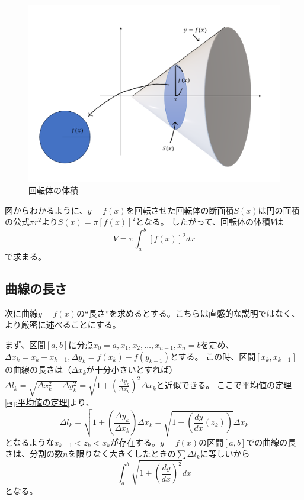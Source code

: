 \documentclass[a4j,dvipdfmx]{jsarticle}
\begin{document}
                \begin{figure}[h]
                    \centering
                    \includegraphics[scale=0.5]{img/QuuNote/rolling_Sx.png}
                    \caption{回転体の体積}
                \end{figure}

                図からわかるように、$y=f(x)$を回転させた回転体の断面積$S(x)$は円の面積の公式$\pi r^2$より$S(x)=\pi\left[f(x)\right]^2$となる。
                したがって、回転体の体積$V$は
                \begin{equation}
                    V=\pi\int_{a}^{b}\left[f(x)\right]^2 dx \label{eq:回転体の体積}
                \end{equation}
                で求まる。
            \clearpage
            \subsection{曲線の長さ}
                次に曲線$y=f(x)$の``長さ''を求めるとする。こちらは直感的な説明ではなく、より厳密に述べることにする。
                
                まず、区間$[a,b]$に分点$x_0=a,x_1,x_2,\dots,x_{n-1},x_n=b$を定め、$\Delta x_k=x_k - x_{k-1},\Delta y_k = f(x_k)-f(y_{k-1})$とする。
                この時、区間$[x_k,x_{k-1}]$の曲線の長さは（$\Delta x_k$が十分小さいとすれば）$\displaystyle \Delta l_k = \sqrt{\Delta x_k^2+\Delta y_k^2}=\sqrt{1+\left(\frac{\Delta y_k}{\Delta x_k}\right)^2}\Delta x_k$と近似できる。
                ここで平均値の定理\eqref{eq:平均値の定理}より、
                \begin{equation*}
                    \Delta l_k=\sqrt{1+\left(\frac{\Delta y_k}{\Delta x_k}\right)}\Delta x_k = \sqrt{1+\left(\frac{dy}{dx}(z_k)\right)}\Delta x_k
                \end{equation*}
                となるような$x_{k-1}<z_k<x_k$が存在する。$y=f(x)$の区間$[a,b]$での曲線の長さは、分割の数$n$を限りなく大きくしたときの$\sum \Delta l_k$に等しいから
                \begin{equation}
                    \int_{a}^{b} \sqrt{1+\left(\frac{dy}{dx}\right)^2}dx \label{eq:曲線の長さ}
                \end{equation}
                となる。
\end{document}
